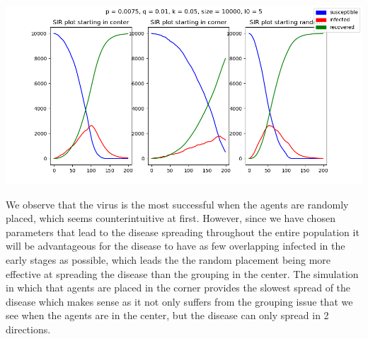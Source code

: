 \documentclass[twoside]{extarticle}                                    %
\numberwithin{equation}{section}                                       %
\begin{document}
\begin{center}
    \includegraphics[trim = {1.5cm 0 0 0}, clip, width = 0.65\linewidth]{../plots/startdiff.png}
\end{center}
We observe that the virus is the most successful when the agents are randomly placed, which seems counterintuitive at first. However, since we have chosen parameters that lead to the disease spreading throughout the entire population it will be advantageous for the disease to have as few overlapping infected in the early stages as possible, which leads the the random placement being more effective at spreading the disease than the grouping in the center. The simulation in which that agents are placed in the corner provides the slowest spread of the disease which makes sense as it not only suffers from the grouping issue that we see when the agents are in the center, but the disease can only spread in 2 directions.
\end{document}
